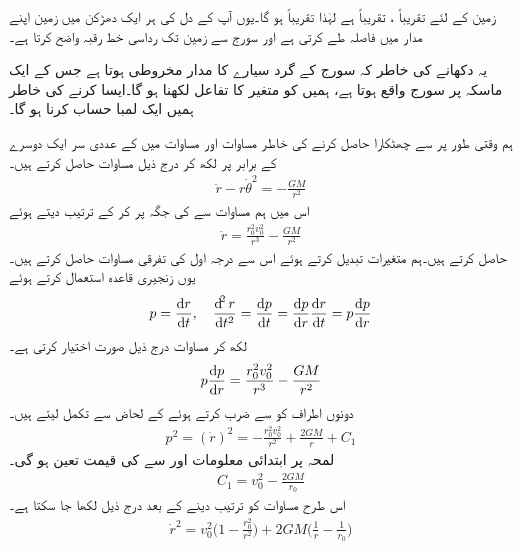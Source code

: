 زمین کے لئے    تقریباً    ،  تقریباً   ہے لہٰذا تقریباً  ہو گا۔یوں آپ کے دل کی ہر ایک  دھڑکن میں  زمین اپنے مدار میں   فاصلہ طے کرتی ہے اور سورج سے زمین تک رداسی خط  رقبہ واضح کرتا ہے۔ 

یہ دکھانے کی خاطر کہ سورج کے گرد سیارے  کا  مدار مخروطی ہوتا ہے   جس کے ایک ماسکہ پر سورج واقع ہوتا ہے، ہمیں  کو متغیر  کا تفاعل لکھنا ہو گا۔ایسا کرنے کی خاطر ہمیں ایک لمبا حساب کرنا ہو گا۔ 

ہم وقتی طور پر  سے چھٹکارا حاصل کرنے کی خاطر   مساوات  اور مساوات  میں  کے عددی سر ایک دوسرے کے برابر پر لکھ کر درج ذیل مساوات حاصل کرتے ہیں۔
\begin{align}\label{مساوات_سمتی_تفاعل_کپلر_ثبوت_پہلا_الف}
\ddot{r}-r\dot{\theta}^2=-\frac{GM}{r^2}
\end{align}
اس میں ہم  مساوات  سے   کی جگہ    پر کر کے ترتیب دیتے  ہوئے
\begin{align}\label{مساوات_سمتی_تفاعل_کپلر_ثبوت_پہلا_ب}
\ddot{r}=\frac{r_0^2v_0^2}{r^3}-\frac{GM}{r^2}
\end{align}
حاصل کرتے ہیں۔ہم متغیرات تبدیل کرتے ہوئے اس سے درجہ اول کی تفرقی مساوات حاصل کرتے ہیں۔یوں زنجیری قاعدہ  استعمال کرتے ہوئے
\begin{align*}
p=\frac{\dif r}{\dif t},\quad \frac{\dif^2r}{\dif t^2}=\frac{\dif p}{\dif t}=\frac{\dif p}{\dif r}\frac{\dif r}{\dif t}=p\frac{\dif p}{\dif r}
\end{align*}
لکھ کر مساوات   درج  ذیل صورت اختیار کرتی ہے۔
\begin{align}\label{مساوات_سمتی_تفاعل_کپلر_ثبوت_پہلا_پ}
p\frac{\dif p}{\dif r}=\frac{r_0^2v_0^2}{r^3}-\frac{GM}{r^2}
\end{align}
دونوں اطراف کو  سے ضرب کرتے ہوئے  کے لحاض سے تکمل لیتے ہیں۔
\begin{align}\label{مساوات_سمتی_تفاعل_کپلر_ثبوت_پہلا_ت}
p^2=(\dot{r})^2=-\frac{r_0^2v_0^2}{r^2}+\frac{2GM}{r}+C_1
\end{align}
لمحہ  پر ابتدائی معلومات  اور   سے  کی قیمت تعین ہو گی۔
\begin{align*}
C_1=v_0^2-\frac{2GM}{r_0}
\end{align*}
اس طرح مساوات   کو ترتیب دینے کے بعد درج ذیل لکھا جا سکتا ہے۔
\begin{align}\label{مساوات_سمتی_تفاعل_کپلر_ثبوت_پہلا_ٹ}
\dot{r}^2=v_0^2\big(1-\frac{r_0^2}{r^2}\big)+2GM\big(\frac{1}{r}-\frac{1}{r_0}\big)
\end{align}


